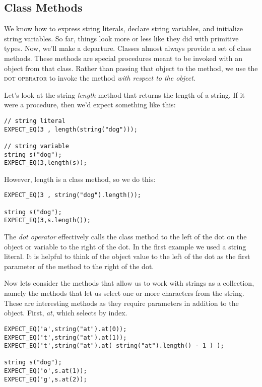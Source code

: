 \documentclass[]{tufte-handout}
\begin{document}
\subsection{Class Methods}

We know how to express string literals, declare string variables, and initialize string variables.  So far, things look more or less like they did with primitive types. Now, we'll make a departure.  Classes almost always provide a set of class methods. These methods are special procedures meant to be invoked with an object from that class.  Rather than passing that object to the method, we use the \textsc{dot operator} to invoke the method \textit{with respect to the object}.  

Let's look at the string \textit{length} method that returns the length of a string.  If it were a procedure, then we'd expect something like this:
\begin{verbatim}
// string literal
EXPECT_EQ(3 , length(string("dog")));

// string variable
string s("dog");
EXPECT_EQ(3,length(s));
\end{verbatim}

However, length is a class method, so we do this:
\begin{verbatim}
EXPECT_EQ(3 , string("dog").length());

string s("dog");
EXPECT_EQ(3,s.length());
\end{verbatim}
The \textit{dot operator} effectively calls the class method to the left of the dot on the object or variable to the right of the dot. In the first example we used a string literal.  It is helpful to think of the object value to the left of the dot as the first parameter of the method to the right of the dot.  

Now lets consider the methods that allow us to work with strings as a collection, namely the methods that let us select one or more characters from the string.  These are interesting methods as they require parameters in addition to the object.  First, \textit{at}, which selects by index.
\begin{verbatim}
EXPECT_EQ('a',string("at").at(0));
EXPECT_EQ('t',string("at").at(1));
EXPECT_EQ('t',string("at").at( string("at").length() - 1 ) );

string s("dog");
EXPECT_EQ('o',s.at(1));
EXPECT_EQ('g',s.at(2));
\end{verbatim}
\end{document}
